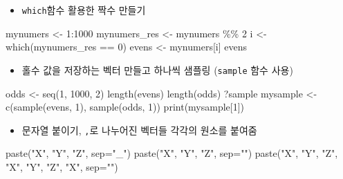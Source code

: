 \documentclass[
]{book}
\newenvironment{Shaded}{\begin{snugshade}}{\end{snugshade}}
\newcommand{\AttributeTok}[1]{\textcolor[rgb]{0.77,0.63,0.00}{#1}}
\newcommand{\DecValTok}[1]{\textcolor[rgb]{0.00,0.00,0.81}{#1}}
\newcommand{\FunctionTok}[1]{\textcolor[rgb]{0.00,0.00,0.00}{#1}}
\newcommand{\NormalTok}[1]{#1}
\newcommand{\OtherTok}[1]{\textcolor[rgb]{0.56,0.35,0.01}{#1}}
\newcommand{\SpecialCharTok}[1]{\textcolor[rgb]{0.00,0.00,0.00}{#1}}
\newcommand{\StringTok}[1]{\textcolor[rgb]{0.31,0.60,0.02}{#1}}
\providecommand{\tightlist}{%
  \setlength{\itemsep}{0pt}\setlength{\parskip}{0pt}}
\begin{document}
\begin{itemize}
\tightlist
\item
  \texttt{which}함수 활용한 짝수 만들기
\end{itemize}

\begin{Shaded}
\begin{Highlighting}[]
\NormalTok{mynumers }\OtherTok{\textless{}{-}} \DecValTok{1}\SpecialCharTok{:}\DecValTok{1000}
\NormalTok{mynumers\_res }\OtherTok{\textless{}{-}}\NormalTok{ mynumers }\SpecialCharTok{\%\%} \DecValTok{2}
\NormalTok{i }\OtherTok{\textless{}{-}} \FunctionTok{which}\NormalTok{(mynumers\_res }\SpecialCharTok{==} \DecValTok{0}\NormalTok{)}
\NormalTok{evens }\OtherTok{\textless{}{-}}\NormalTok{ mynumers[i]}
\NormalTok{evens}
\end{Highlighting}
\end{Shaded}

\begin{itemize}
\tightlist
\item
  홀수 값을 저장하는 벡터 만들고 하나씩 샘플링 (\texttt{sample} 함수 사용)
\end{itemize}

\begin{Shaded}
\begin{Highlighting}[]
\NormalTok{odds }\OtherTok{\textless{}{-}} \FunctionTok{seq}\NormalTok{(}\DecValTok{1}\NormalTok{, }\DecValTok{1000}\NormalTok{, }\DecValTok{2}\NormalTok{)}
\FunctionTok{length}\NormalTok{(evens)}
\FunctionTok{length}\NormalTok{(odds)}
\NormalTok{?sample}
\NormalTok{mysample }\OtherTok{\textless{}{-}} \FunctionTok{c}\NormalTok{(}\FunctionTok{sample}\NormalTok{(evens, }\DecValTok{1}\NormalTok{), }\FunctionTok{sample}\NormalTok{(odds, }\DecValTok{1}\NormalTok{))}
\FunctionTok{print}\NormalTok{(mysample[}\DecValTok{1}\NormalTok{])}
\end{Highlighting}
\end{Shaded}

\begin{itemize}
\tightlist
\item
  문자열 붙이기, \texttt{,}로 나누어진 벡터들 각각의 원소를 붙여줌
\end{itemize}

\begin{Shaded}
\begin{Highlighting}[]
\FunctionTok{paste}\NormalTok{(}\StringTok{"X"}\NormalTok{, }\StringTok{"Y"}\NormalTok{, }\StringTok{"Z"}\NormalTok{, }\AttributeTok{sep=}\StringTok{"\_"}\NormalTok{)}
\FunctionTok{paste}\NormalTok{(}\StringTok{"X"}\NormalTok{, }\StringTok{"Y"}\NormalTok{, }\StringTok{"Z"}\NormalTok{, }\AttributeTok{sep=}\StringTok{""}\NormalTok{)}
\FunctionTok{paste}\NormalTok{(}\StringTok{"X"}\NormalTok{, }\StringTok{"Y"}\NormalTok{, }\StringTok{"Z"}\NormalTok{, }\StringTok{"X"}\NormalTok{, }\StringTok{"Y"}\NormalTok{, }\StringTok{"Z"}\NormalTok{, }\StringTok{"X"}\NormalTok{, }\AttributeTok{sep=}\StringTok{""}\NormalTok{)}
\end{Highlighting}
\end{Shaded}
\end{document}
